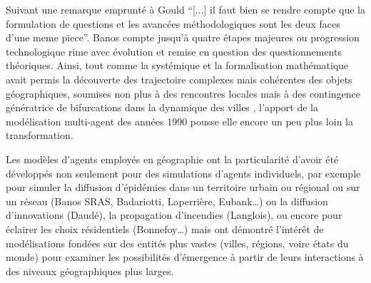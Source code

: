 Suivant une remarque emprunté à Gould \autocite[31]{Gould2004} \enquote{[...] il faut bien se rendre compte que la formulation de questions et les avancées méthodologiques sont les deux faces d'une meme piece}. Banos \autocite{Banos2013} compte jusqu'à quatre étapes majeures ou progression technologique rime avec évolution et remise en question des questionnements théoriques. Ainsi, tout comme la systémique et la formalisation mathématique avait permis la découverte des trajectoire complexes mais cohérentes des objets géographiques, soumises non plus à des rencontres locales mais à des contingence génératrice de bifurcations dans la dynamique des villes \autocite[137]{Pumain2002}, l'apport de la modélisation multi-agent des années 1990 pousse elle encore un peu plus loin la transformation. \autocite{Sanders2007}


Les modèles d’agents employés en géographie ont la particularité d’avoir été développés non seulement pour des simulations d’agents individuels, par exemple pour simuler la diffusion d’épidémies dans un territoire urbain ou régional ou sur un réseau (Banos SRAS, Badariotti, Laperrière, Eubank…) ou la diffusion d’innovations (Daudé), la propagation d’incendies (Langlois), ou encore pour éclairer les choix résidentiels (Bonnefoy…) mais ont démontré l’intérêt de modélisations fondées sur des entités plus vastes (villes, régions, voire états du monde) pour examiner les possibilités d’émergence à partir de leurs interactions à des niveaux géographiques plus larges. 


